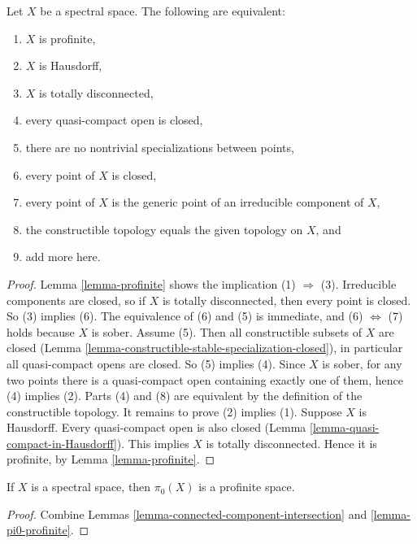 \begin{lemma}
\label{lemma-characterize-profinite-spectral}
Let $X$ be a spectral space. The following are equivalent:
\begin{enumerate}
\item $X$ is profinite,
\item $X$ is Hausdorff,
\item $X$ is totally disconnected,
\item every quasi-compact open is closed,
\item there are no nontrivial specializations between points,
\item every point of $X$ is closed,
\item every point of $X$ is the generic point of an irreducible component
of $X$,
\item the constructible topology equals the given topology on $X$, and
\item add more here.
\end{enumerate}
\end{lemma}

\begin{proof}
Lemma \ref{lemma-profinite} shows the implication (1) $\Rightarrow$ (3).
Irreducible components are closed, so if $X$ is totally disconnected, then
every point is closed. So (3) implies (6). The equivalence of (6) and (5)
is immediate, and (6) $\Leftrightarrow$ (7) holds because $X$ is sober.
Assume (5). Then all constructible subsets of $X$ are closed
(Lemma \ref{lemma-constructible-stable-specialization-closed}), in
particular all quasi-compact opens are closed. So (5) implies (4).
Since $X$ is sober, for any two points there is a quasi-compact open
containing exactly one of them, hence (4) implies (2).
Parts (4) and (8) are equivalent by the definition of the
constructible topology.
It remains to prove (2) implies (1). Suppose $X$ is Hausdorff. Every
quasi-compact open is also closed
(Lemma \ref{lemma-quasi-compact-in-Hausdorff}). This implies $X$
is totally disconnected. Hence it is profinite, by
Lemma \ref{lemma-profinite}.
\end{proof}

\begin{lemma}
\label{lemma-spectral-pi0}
If $X$ is a spectral space, then $\pi_0(X)$ is a profinite space.
\end{lemma}

\begin{proof}
Combine Lemmas \ref{lemma-connected-component-intersection} and
\ref{lemma-pi0-profinite}.
\end{proof}

